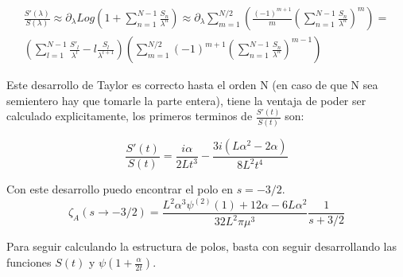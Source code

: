 \begin{equation}
\begin{array}{c}

\frac{S'( \lambda)}{S( \lambda )} \approx 
\partial _{\lambda} Log \left(
								1 + \sum _{n=1} ^{N-1}  \frac{S _n}{\lambda ^n}
								\right) \approx 
\partial _{\lambda} 
	
\sum _{m = 1} ^{N/2} 
	\left(
	\frac{(-1) ^{m+1} }{m}
	\left(
		\sum _{n=1} ^{N-1} \frac{S _n}{\lambda ^n}
		\right) ^m 
	\right) = \\ [10pt]
	
\left(								
	\sum _{l = 1} ^{N-1} 
	\frac{S' _l}{\lambda ^l} - l \frac{S _l}{\lambda ^{l+1}}
	\right)							

\left(
	\sum _{m = 1} ^{N/2} (-1) ^{m+1} 


	\left(
			\sum _{n=1} ^{N-1} \frac{S _n}{\lambda ^n}
			\right) ^{m-1}
			
	\right)


	
\end{array}	
\end{equation}



Este desarrollo de Taylor es correcto hasta el orden N (en caso de que N sea semientero hay que tomarle la parte entera), tiene la ventaja de poder ser calculado explicitamente, los primeros terminos de $\frac{S'(t)}{S(t)}$ son:

\begin{equation}
\frac{S'(t)}{S(t)} = 
\frac{i \alpha}{2 L t^3} -
\frac{3 i (L \alpha ^2 - 2 \alpha)}{8 L^2 t ^4}
\end{equation}




Con este desarrollo puedo encontrar el polo en $s=-3/2$.
\begin{equation}
\zeta _A (s \rightarrow -3/2) = 
\frac{L ^2 \alpha  ^3 \psi ^{(2)} (1) + 12   \alpha  - 6 L \alpha ^2}{32 L^2 \pi \mu ^3}
\frac{1}{s+3/2}
\end{equation}

Para seguir calculando la estructura de polos, basta con seguir desarrollando las funciones $S(t)$ y $\psi (1 + \frac{\alpha}{2 t})$.

